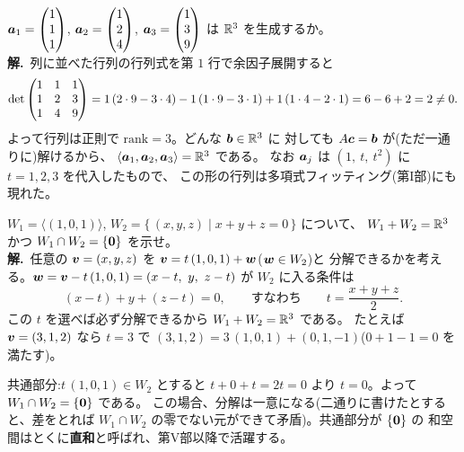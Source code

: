 \begin{rei}[例題・標準(全体を張るかの判定)]\label{rei:sub-span}
$\bm{a}_1 = \begin{pmatrix}1 \\ 1 \\ 1\end{pmatrix}$, $\bm{a}_2 = \begin{pmatrix}1 \\ 2 \\ 4\end{pmatrix}$,
$\bm{a}_3 = \begin{pmatrix}1 \\ 3 \\ 9\end{pmatrix}$ は $\mathbb{R}^3$ を生成するか。\\
\textbf{解.}\ 列に並べた行列の行列式を第 $1$ 行で余因子展開すると
\[
\det \begin{pmatrix}1 & 1 & 1 \\ 1 & 2 & 3 \\ 1 & 4 & 9\end{pmatrix}
= 1\,(2 \cdot 9 - 3 \cdot 4) - 1\,(1 \cdot 9 - 3 \cdot 1)
+ 1\,(1 \cdot 4 - 2 \cdot 1) = 6 - 6 + 2 = 2 \neq 0.
\]
よって行列は正則で $\mathrm{rank} = 3$。どんな $\bm{b} \in \mathbb{R}^3$ に
対しても $A\bm{c} = \bm{b}$ が(ただ一通りに)解けるから、
$\langle \bm{a}_1, \bm{a}_2, \bm{a}_3 \rangle = \mathbb{R}^3$ である。
なお $\bm{a}_j$ は $(1,\ t,\ t^2)$ に $t = 1, 2, 3$ を代入したもので、
この形の行列は多項式フィッティング(第I部)にも現れた。
\end{rei}

\begin{rei}[例題・標準(和空間への分解)]\label{rei:sub-decomp}
$W_1 = \langle (1, 0, 1) \rangle$,
$W_2 = \{\, (x, y, z) \mid x + y + z = 0 \,\}$ について、
$W_1 + W_2 = \mathbb{R}^3$ かつ $W_1 \cap W_2 = \{\bm{0}\}$ を示せ。\\
\textbf{解.}\ 任意の $\bm{v} = (x, y, z)$ を
$\bm{v} = t\,(1, 0, 1) + \bm{w}$($\bm{w} \in W_2$)と
分解できるかを考える。$\bm{w} = \bm{v} - t\,(1, 0, 1)
= (x - t,\ y,\ z - t)$ が $W_2$ に入る条件は
\[
(x - t) + y + (z - t) = 0, \qquad \text{すなわち} \qquad
t = \frac{x + y + z}{2}.
\]
この $t$ を選べば必ず分解できるから $W_1 + W_2 = \mathbb{R}^3$ である。
たとえば $\bm{v} = (3, 1, 2)$ なら $t = 3$ で
$(3,1,2) = 3\,(1,0,1) + (0, 1, -1)$($0 + 1 - 1 = 0$ を満たす)。

共通部分:$t\,(1, 0, 1) \in W_2$ とすると $t + 0 + t = 2t = 0$ より
$t = 0$。よって $W_1 \cap W_2 = \{\bm{0}\}$ である。
この場合、分解は一意になる(二通りに書けたとすると、差をとれば
$W_1 \cap W_2$ の零でない元ができて矛盾)。共通部分が $\{\bm{0}\}$ の
和空間はとくに\textbf{直和}と呼ばれ、第V部以降で活躍する。
\end{rei}

